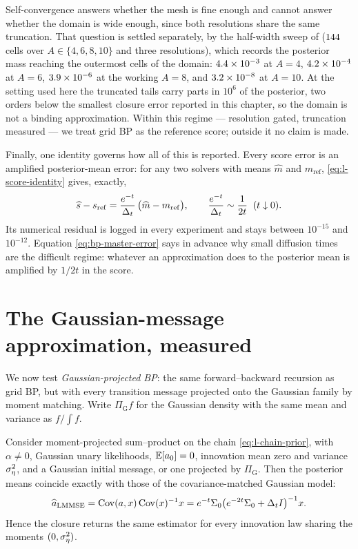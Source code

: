 Self-convergence answers whether the mesh is fine enough and cannot answer
whether the domain is wide enough, since both resolutions share the same
truncation. That question is settled separately, by the half-width sweep of
 ($144$ cells over $A \in \{4,6,8,10\}$ and three
resolutions), which records the posterior mass reaching the outermost cells of
the domain: $4.4 \times 10^{-3}$ at $A = 4$, $4.2 \times 10^{-4}$ at $A = 6$,
$3.9 \times 10^{-6}$ at the working $A = 8$, and $3.2 \times 10^{-8}$ at $A = 10$. At the
setting used here the truncated tails carry parts in $10^{6}$ of the
posterior, two orders below the smallest closure error reported in this
chapter, so the domain is not a binding approximation. Within this
regime --- resolution gated, truncation measured --- we treat grid BP as the
reference score; outside it no claim is made.

Finally, one identity governs how all of this is reported. Every score error is
an amplified posterior-mean error: for any two solvers with means $\widehat m$
and $m_{\mathrm{ref}}$, \eqref{eq:l-score-identity} gives, exactly,
\begin{equation}
  \widehat s - s_{\mathrm{ref}}
  = \frac{e^{-t}}{\Delta_t}\,\big( \widehat m - m_{\mathrm{ref}} \big),
  \qquad
  \frac{e^{-t}}{\Delta_t} \sim \frac{1}{2t} \;\; (t \downarrow 0).
  \label{eq:bp-master-error}
\end{equation}
Its numerical residual is logged in every experiment and stays between
$10^{-15}$ and $10^{-12}$. Equation \eqref{eq:bp-master-error} says in advance
why small diffusion times are the difficult regime: whatever an approximation
does to the posterior mean is amplified by $1/2t$ in the score.

\section{The Gaussian-message approximation, measured}
\label{sec:l-closure}

We now test \emph{Gaussian-projected BP}: the same forward--backward
recursion as grid BP, but with every transition message projected onto the
Gaussian family by moment matching. Write $\Pi_{\mathrm G} f$ for the Gaussian
density with the same mean and variance as $f/\!\int f$.

\begin{theorem}
\label{thm:l-lmmse}
Consider moment-projected sum--product on the chain
\eqref{eq:l-chain-prior}, with $\alpha\neq0$, Gaussian unary likelihoods,
$\mathbb{E}[a_0]=0$, innovation mean zero and variance $\sigma_\eta^2$, and a Gaussian
initial message, or one projected by $\Pi_{\mathrm G}$. Then the posterior
means coincide exactly with those of the covariance-matched Gaussian model:
\begin{equation}
  \widehat a_{\mathrm{LMMSE}}
  =
  \operatorname{Cov}(a,x)\operatorname{Cov}(x)^{-1}x
  =
  e^{-t}\Sigma_0
  \bigl(e^{-2t}\Sigma_0+\Delta_t I\bigr)^{-1}x .
  \label{eq:l-lmmse}
\end{equation}
Hence the closure returns the same estimator for every innovation law sharing
the moments $(0,\sigma_\eta^2)$.
\end{theorem}


